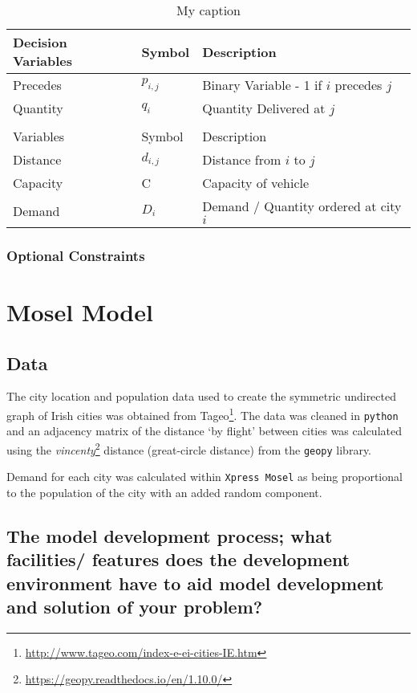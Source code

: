 \documentclass[a4paper,11pt]{article}
\begin{document}
\begin{table}[h!]
\centering
\caption{My caption}
\label{variables}
\begin{tabular}{lll}
\hline
Decision Variables & Symbol & Description \\
\hline
\hline
Precedes & $p_{i,j}$  & Binary Variable - 1 if $i$ precedes $j$\\
Quantity & $q_{i}$ & Quantity Delivered at $j$ \\
\\
\hline
Variables & Symbol & Description \\
\hline
\hline
Distance & $d_{i,j}$ & Distance from $i$ to $j$  \\
Capacity & C & Capacity of vehicle \\ 
Demand & $D_{i}$ & Demand / Quantity ordered at city $i$ \\  
\end{tabular}
\end{table}

\subsubsection{Optional Constraints}


\section{Mosel Model}

\subsection{Data}

The city location and population data used to create the symmetric undirected graph of Irish cities was obtained from Tageo\footnote{\url{http://www.tageo.com/index-e-ei-cities-IE.htm}}. The data was cleaned in \texttt{python} and an adjacency matrix of the distance `by flight' between cities was calculated using the \textit{vincenty}\footnote{\url{https://geopy.readthedocs.io/en/1.10.0/}} distance (great-circle distance) from the \texttt{geopy} library.

Demand for each city was calculated within \texttt{Xpress Mosel} as being proportional to the population of the city with an added random component.

\subsection{The model development process; what facilities/ features does the development environment
have to aid model development and solution of your problem? }
\end{document}
